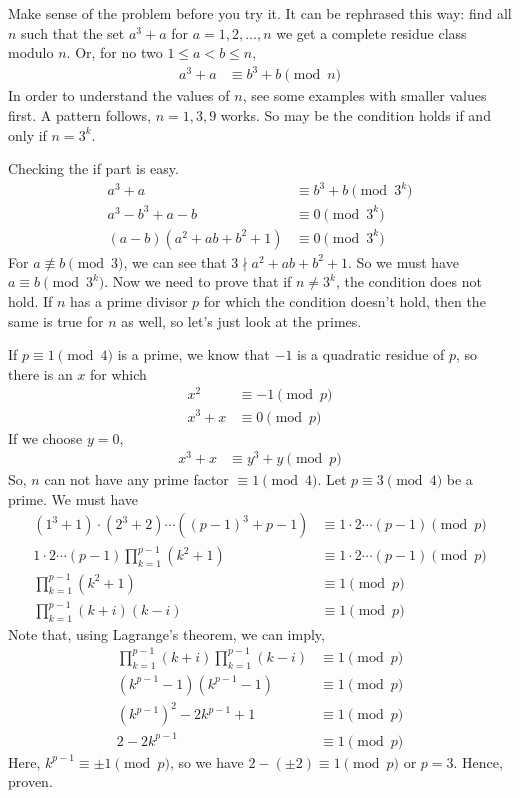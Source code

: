 \documentclass[problems.tex]{subfile}
\begin{document}
	\begin{solution}
		Make sense of the problem before you try it. It can be rephrased this way: find all $n$ such that the set $a^3+a$ for $a=1,2,\ldots,n$ we get a complete residue class modulo $n$. Or, for no two $1\leq a<b\leq n$,
			\begin{align*}
				a^3+a &\equiv b^3+b\pmod n
			\end{align*}
		In order to understand the values of $n$, see some examples with smaller values first. A pattern follows, $n=1,3,9$ works. So may be the condition holds if and only if $n=3^k$.
		
		Checking the if part is easy. 
			\begin{align*}
				a^3+a & \equiv b^3+b\pmod {3^k}\\
				a^3-b^3+a-b &\equiv0\pmod{3^k}\\
				(a-b)(a^2+ab+b^2+1)&\equiv0\pmod{3^k}
			\end{align*}
		For $a\not\equiv b\pmod{3}$, we can see that $3\nmid a^2+ab+b^2+1$. So we must have $a\equiv b\pmod{3^k}$. Now we need to prove that if $n\neq3^k$, the condition does not hold. If $n$ has a prime divisor $p$ for which the condition doesn't hold, then the same is true for $n$ as well, so let's just look at the primes.
		
		If $p\equiv1\pmod4$ is a prime, we know that $-1$ is a quadratic residue of $p$, so there is an $x$ for which
			\begin{align*}
				x^2 & \equiv-1\pmod p\\
				x^3+x&\equiv0\pmod p
			\end{align*}
		If we choose $y=0$,
			\begin{align*}
				x^3+x&\equiv y^3+y\pmod p
			\end{align*}
		So, $n$ can not have any prime factor $\equiv1\pmod4$. Let $p\equiv3\pmod4$ be a prime. We must have
			\begin{align*}
				(1^3+1)\cdot(2^3+2)\cdots((p-1)^3+p-1) &\equiv1\cdot2\cdots(p-1)\pmod p\\
				1\cdot2\cdots(p-1)\prod_{k=1}^{p-1}(k^2+1)&\equiv1\cdot2\cdots(p-1)\pmod p\\
				\prod_{k=1}^{p-1}(k^2+1)&\equiv1\pmod p\\
				\prod_{k=1}^{p-1}(k+i)(k-i)&\equiv1\pmod p
			\end{align*}
		Note that, using Lagrange's theorem, we can imply,
			\begin{align*}
				\prod_{k=1}^{p-1}(k+i)\prod_{k=1}^{p-1}(k-i)&\equiv1\pmod p\\
				(k^{p-1}-1)(k^{p-1}-1)&\equiv1\pmod p\\
				(k^{p-1})^2-2k^{p-1}+1&\equiv1\pmod p\\
				2-2k^{p-1}&\equiv1\pmod p
			\end{align*}
		Here, $k^{p-1}\equiv\pm1\pmod p$, so we have $2-(\pm2)\equiv1\pmod p$ or $p=3$. Hence, proven.
	\end{solution}
	
\end{document}
